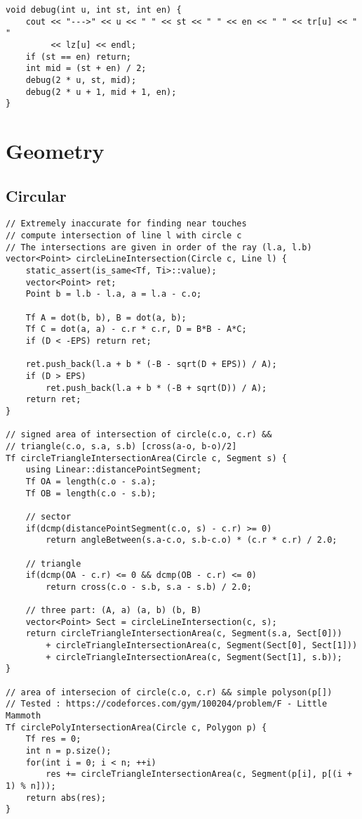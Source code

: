 \documentclass[FSZ,a4paper,onesided]{article}
\begin{document}
\begin{multicols*}{\COLS}
\begin{lstlisting}
void debug(int u, int st, int en) {
    cout << "--->" << u << " " << st << " " << en << " " << tr[u] << " "
         << lz[u] << endl;
    if (st == en) return;
    int mid = (st + en) / 2;
    debug(2 * u, st, mid);
    debug(2 * u + 1, mid + 1, en);
}

\end{lstlisting}
\section{Geometry}
\subsection{Circular}
\begin{lstlisting}
// Extremely inaccurate for finding near touches
// compute intersection of line l with circle c
// The intersections are given in order of the ray (l.a, l.b)
vector<Point> circleLineIntersection(Circle c, Line l) {
    static_assert(is_same<Tf, Ti>::value);
    vector<Point> ret;
    Point b = l.b - l.a, a = l.a - c.o;

    Tf A = dot(b, b), B = dot(a, b);
    Tf C = dot(a, a) - c.r * c.r, D = B*B - A*C;
    if (D < -EPS) return ret;

    ret.push_back(l.a + b * (-B - sqrt(D + EPS)) / A);
    if (D > EPS)
        ret.push_back(l.a + b * (-B + sqrt(D)) / A);
    return ret;
}

// signed area of intersection of circle(c.o, c.r) &&
// triangle(c.o, s.a, s.b) [cross(a-o, b-o)/2]
Tf circleTriangleIntersectionArea(Circle c, Segment s) {
    using Linear::distancePointSegment;
    Tf OA = length(c.o - s.a);
    Tf OB = length(c.o - s.b);

    // sector
    if(dcmp(distancePointSegment(c.o, s) - c.r) >= 0)
        return angleBetween(s.a-c.o, s.b-c.o) * (c.r * c.r) / 2.0;

    // triangle
    if(dcmp(OA - c.r) <= 0 && dcmp(OB - c.r) <= 0)
        return cross(c.o - s.b, s.a - s.b) / 2.0;

    // three part: (A, a) (a, b) (b, B)
    vector<Point> Sect = circleLineIntersection(c, s);
    return circleTriangleIntersectionArea(c, Segment(s.a, Sect[0]))
        + circleTriangleIntersectionArea(c, Segment(Sect[0], Sect[1]))
        + circleTriangleIntersectionArea(c, Segment(Sect[1], s.b));
}

// area of intersecion of circle(c.o, c.r) && simple polyson(p[])
// Tested : https://codeforces.com/gym/100204/problem/F - Little Mammoth
Tf circlePolyIntersectionArea(Circle c, Polygon p) {
    Tf res = 0;
    int n = p.size();
    for(int i = 0; i < n; ++i)
        res += circleTriangleIntersectionArea(c, Segment(p[i], p[(i + 1) % n]));
    return abs(res);
}


\end{lstlisting}
\end{multicols*}
\end{document}
